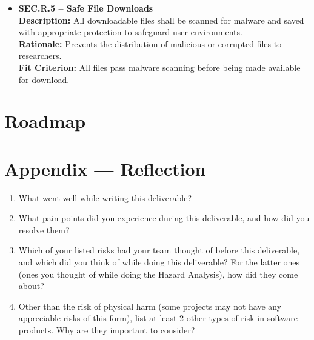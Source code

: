 \documentclass{article}
\begin{document}
\begin{itemize}
    \item \textbf{SEC.R.5 -- Safe File Downloads} \\
    \textbf{Description:} All downloadable files shall be scanned for malware and saved with appropriate protection to safeguard user environments. \\
    \textbf{Rationale:} Prevents the distribution of malicious or corrupted files to researchers. \\
    \textbf{Fit Criterion:} All files pass malware scanning before being made available for download.
\end{itemize}


\section{Roadmap}


\newpage{}

\section*{Appendix --- Reflection}




\begin{enumerate}
    \item What went well while writing this deliverable? 
    \item What pain points did you experience during this deliverable, and how
    did you resolve them?
    \item Which of your listed risks had your team thought of before this
    deliverable, and which did you think of while doing this deliverable? For
    the latter ones (ones you thought of while doing the Hazard Analysis), how
    did they come about?
    \item Other than the risk of physical harm (some projects may not have any
    appreciable risks of this form), list at least 2 other types of risk in
    software products. Why are they important to consider?
\end{enumerate}
\end{document}
